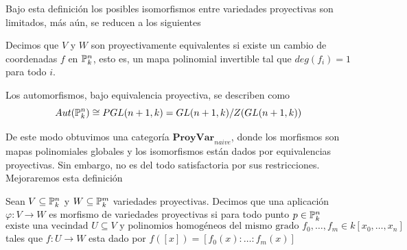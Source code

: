 \documentclass[11pt]{article}
\begin{document}
\noindent Bajo esta definición los posibles isomorfismos entre variedades proyectivas son 
limitados, más aún, se reducen a los siguientes

\begin{dfn}
    Decimos que $V$ y $W$ son proyectivamente equivalentes si existe un cambio de coordenadas $f$ 
    en $\P_{k}^{n}$, esto es, un mapa polinomial invertible tal que $deg(f_{i})=1$ para todo $i$.
\end{dfn}

\begin{prop}
    Los automorfismos, bajo equivalencia proyectiva, se describen como
    \begin{equation*}
        Aut(\P_{k}^{n})\cong PGL(n+1,k)=GL(n+1,k)/Z(GL(n+1,k))
    \end{equation*}
\end{prop}

\noindent De este modo obtuvimos una categoría $\textbf{ProyVar}_{naive}$, donde los morfismos son 
mapas polinomiales globales y los isomorfismos están dados por equivalencias proyectivas. Sin 
embargo, no es del todo satisfactoria por sus restricciones. Mejoraremos esta definición

\begin{dfn}
    Sean $V\subseteq\P_{k}^{n}$ y $W\subseteq\P_{k}^{m}$ variedades proyectivas. Decimos que una 
    aplicación $\varphi:V\to W$ es morfismo de variedades proyectivas si para todo punto 
    $p\in \P_{k}^{n}$
    \begin{equation*}
        \text{existe una vecindad } U\subseteq V 
        \text{ y polinomios homogéneos del mismo grado }f_{0},\dots,f_{m}\in k[x_{0},\dots,x_{n}]
    \end{equation*}
    tales que $f:U\to W$ esta dado por $f([x])=[f_{0}(x):\dots:f_{m}(x)]$
\end{dfn}
\end{document}
